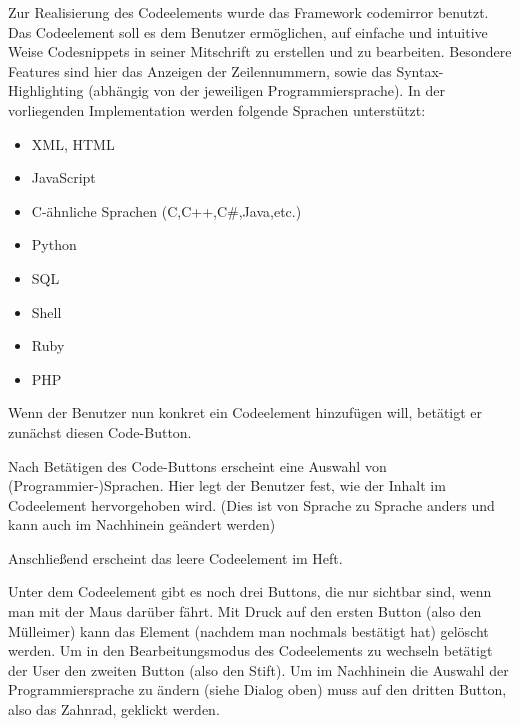 
Zur Realisierung des Codeelements wurde das Framework codemirror \cite{CODEM} benutzt. Das Codeelement soll es dem Benutzer ermöglichen, auf einfache und intuitive Weise Codesnippets in seiner Mitschrift zu erstellen und zu bearbeiten. Besondere Features sind hier das Anzeigen der Zeilennummern, sowie das Syntax-Highlighting (abhängig von der jeweiligen Programmiersprache). In der vorliegenden Implementation werden folgende Sprachen unterstützt:
\begin{itemize}
\item XML, HTML
\item JavaScript
\item C-ähnliche Sprachen (C,C++,C\#,Java,etc.)
\item Python
\item SQL
\item Shell
\item Ruby
\item PHP
\end{itemize}

Wenn der Benutzer nun konkret ein Codeelement hinzufügen will, betätigt er zunächst diesen Code-Button.


\newpage

Nach Betätigen des Code-Buttons erscheint eine Auswahl von (Programmier-)Sprachen. Hier legt der Benutzer fest, wie der Inhalt im Codeelement hervorgehoben wird. (Dies ist von Sprache zu Sprache anders und kann auch im Nachhinein geändert werden)


Anschließend erscheint das leere Codeelement im Heft.


Unter dem Codeelement gibt es noch drei Buttons, die nur sichtbar sind, wenn man mit der Maus darüber fährt. Mit Druck auf den ersten Button (also den Mülleimer) kann das Element (nachdem man nochmals bestätigt hat) gelöscht werden. Um in den Bearbeitungsmodus des Codeelements zu wechseln betätigt der User den zweiten Button (also den Stift). Um im Nachhinein die Auswahl der Programmiersprache zu ändern (siehe Dialog oben) muss auf den dritten Button, also das Zahnrad, geklickt werden.

